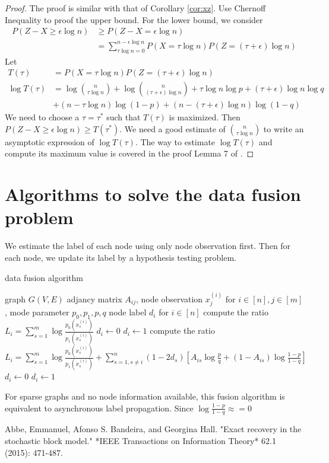 \documentclass{article}
\begin{document}
\begin{proof}
	The proof is similar with that of Corollary \ref{cor:xz}.
	Use Chernoff Inequality to proof the upper bound. For the lower bound, we consider
	\begin{align*}
	P(Z - X \geq \epsilon \log n) & \geq P(Z - X = \epsilon \log n) \\
	& = \sum_{\tau \log n = 0}^{n - \epsilon \log n} P(X = \tau \log n) P(Z = (\tau + \epsilon) \log n)
	\end{align*}
	Let
	\begin{align*}
	T(\tau) &= P(X = \tau \log n) P(Z = (\tau + \epsilon) \log n) \\ 
	\log T(\tau) & = \log \binom{n}{\tau \log n} +  \log \binom{n}{(\tau + \epsilon) \log n}
    +  \tau \log n \log p + (\tau + \epsilon) \log n \log q \\
    &+ (n - \tau \log n) \log (1 - p)
    + (n - (\tau + \epsilon) \log n ) \log (1 - q )
	\end{align*}
	We need to choose a $\tau=\tau^*$ such that $T(\tau)$ is maximized. Then
	$ P(Z - X \geq \epsilon \log n) \geq T(\tau^*)$.
	We need a good estimate of $\binom{n}{\tau \log n}$ to write an asymptotic expression of $\log T(\tau)$.
	The way to estimate $\log T(\tau)$ and compute its maximum value 
    is covered in the proof Lemma 7 of \cite{abbe}.
\end{proof}
\section{Algorithms to solve the data fusion problem}
We estimate the label of each node using only node observation first.
Then for each node, we update its label by a hypothesis testing problem.
\begin{algorithm}
\caption{data fusion algorithm}
\begin{algorithmic}
\REQUIRE graph $G(V,E)$ adjancy matrix $A_{ij}$, node observation $x^{(i)}_{j}$ for $i \in [n], j \in [m]$, mode parameter $p_0, p_1, p, q$
\ENSURE node label $d_i$ for $ i \in [n]$
\STATE compute the ratio $L_i = \sum_{s=1}^m \log\frac{p_0(x^{(i)}_s)}{p_1(x^{(i)}_s)}$ %
\STATE $d_i \leftarrow 0$
\ELSE
\STATE $d_i \leftarrow 1$
\ENDIF
\ENDFOR
{}
\STATE compute the ratio $L_i = \sum_{s=1}^m \log\frac{p_0(x^{(i)}_s)}{p_1(x^{(i)}_s)} + \sum_{s=1, s\neq i}^n
(1-2d_s)[A_{is}\log\frac{p}{q} + (1-A_{is})\log\frac{1-p}{1-q}]$ %
\STATE $d_i \leftarrow 0$
\ELSE
\STATE $d_i \leftarrow 1$
\ENDIF
\ENDFOR
\ENDWHILE
\end{algorithmic}
\end{algorithm}
For sparse graphs and no node information available, this fusion algorithm is equivalent to
asynchronous label propagation. Since $\log\frac{1-p}{1-q} \approx = 0$ 
\begin{thebibliography}{9}
	 Abbe, Emmanuel, Afonso S. Bandeira, and Georgina Hall. "Exact recovery in the stochastic block model." *IEEE Transactions on Information Theory* 62.1 (2015): 471-487.
\end{thebibliography}
\end{document}
